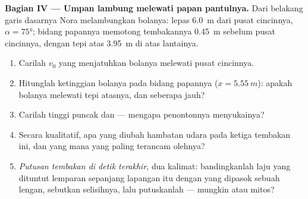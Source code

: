 \begin{problem}
\medskip\noindent\textbf{Bagian IV --- Umpan lambung melewati papan pantulnya.}
Dari belakang garis dasarnya Nora melambungkan bolanya: lepas \qty{6.0}{m}
dari pusat cincinnya, $\alpha = \ang{75}$; bidang papannya memotong
tembakannya \qty{0.45}{m} sebelum pusat cincinnya, dengan tepi atas
\qty{3.95}{m} di atas lantainya.
\begin{enumerate}[resume]
  \item Carilah $v_0$ yang menjatuhkan bolanya melewati pusat cincinnya.
  \item Hitunglah ketinggian bolanya pada bidang papannya
        ($x = \qty{5.55}{m}$): apakah bolanya melewati tepi atasnya, dan
        seberapa jauh?
  \item Carilah tinggi puncak dan  --- mengapa penontonnya
        menyukainya?
  \item Secara kualitatif, apa yang diubah hambatan udara pada ketiga
        tembakan ini, dan yang mana yang paling terancam olehnya?
  \item \emph{Putusan tembakan di detik terakhir}, dua kalimat: bandingkanlah
        laju yang dituntut lemparan sepanjang lapangan itu dengan yang
        dipasok sebuah lengan, sebutkan selisihnya, lalu putuskanlah ---
        mungkin atau mitos?
\end{enumerate}
\end{problem}
